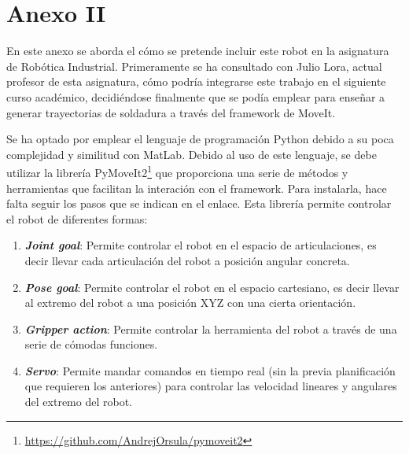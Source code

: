 \chapter*{Anexo II}
\label{cap:anexoii}

\noindent En este anexo se aborda el cómo se pretende incluir este robot en la asignatura de Robótica Industrial. Primeramente 
se ha consultado con Julio Lora, actual profesor de esta asignatura, cómo podría integrarse este trabajo en el siguiente curso académico, decidiéndose 
finalmente que se podía emplear para enseñar a generar trayectorias de soldadura a través del framework de MoveIt. 
  
   
Se ha optado por emplear el lenguaje de programación Python debido a su poca complejidad y similitud con MatLab. Debido al uso de 
este lenguaje, se debe utilizar la librería PyMoveIt2\footnote{\url{https://github.com/AndrejOrsula/pymoveit2}} que proporciona una serie de métodos y herramientas que 
facilitan la interación con el framework. Para instalarla, hace falta seguir los pasos que se indican en el enlace. Esta librería permite controlar 
el robot de diferentes formas:
\begin{enumerate}
\item \textbf{\textit{Joint goal}}: Permite controlar el robot en el espacio de articulaciones, es decir llevar cada articulación del robot a posición angular concreta.
\item \textbf{\textit{Pose goal}}: Permite controlar el robot en el espacio cartesiano, es decir llevar al extremo del robot a una posición XYZ con una 
cierta orientación.
\item \textbf{\textit{Gripper action}}: Permite controlar la herramienta del robot a través de una serie de cómodas funciones.
\item \textbf{\textit{Servo}}: Permite mandar comandos en tiempo real (sin la previa planificación que requieren los anteriores) para controlar las velocidad lineares y 
angulares del extremo del robot.

\end{enumerate}

